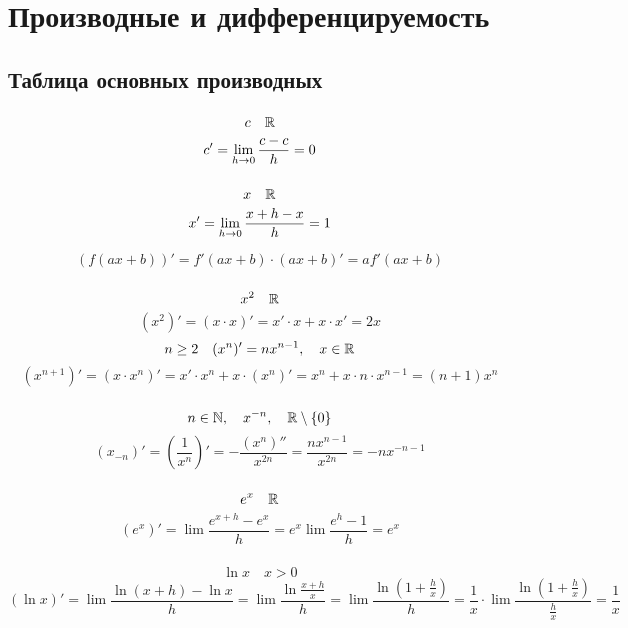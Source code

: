 \chapter{Производные и дифференцируемость}

\section{Таблица основных производных}

\subsection{}
$$ c \quad \mathbb{R}$$
$$ c' = \lim\limits_{h\to0} \frac{c - c}h = 0$$

\subsection{}
$$x \quad \mathbb{R}$$
$$x' = \lim\limits_{h\to0}\frac{x+h-x}h = 1$$

\begin{implication}
$$(f(ax+b))' = f'(ax+b)\cdot (ax+b)' = af'(ax+b)$$
\end{implication}

\subsection{}
$$x^2 \quad \mathbb{R}$$
$$ (x^2)' = (x\cdot x)' = x' \cdot x + x \cdot x' = 2x$$
$$ n \ge 2 \quad (x^n)' = nx^{n-1}, \quad x \in \mathbb{R}$$
$$(x^{n+1})' = (x \cdot x^n)' = x' \cdot x^n + x \cdot (x^n)' = x^n + x \cdot n \cdot x^{n-1} = (n+1)x^n$$

\subsection{}
$$ n \in \mathbb{N}, \quad x^{-n}, \quad \mathbb{R} \setminus \{0\}$$
$$(x_{-n})' = (\frac1{x^n})' = -\frac{(x^n)''}{x^{2n}} = \frac{nx^{n-1}}{x^{2n}} = -nx^{-n-1}$$

\subsection{}
$$ e^x \quad \mathbb{R}$$
$$(e^x)' = \lim \frac{e^{x+h}-e^x}h = e^x\lim \frac{e^h-1}h = e^x$$

\subsection{}
$$ \ln x \quad x > 0$$
$$(\ln x)' = \lim \frac{\ln(x+h)-\ln x}h = \lim \frac{\ln\frac{x+h}x}h = \lim \frac{\ln(1 + \frac{h}x)}h = \frac1x \cdot \lim \frac{\ln(1 + \frac{h}x)}{\frac{h}x} = \frac1x$$

